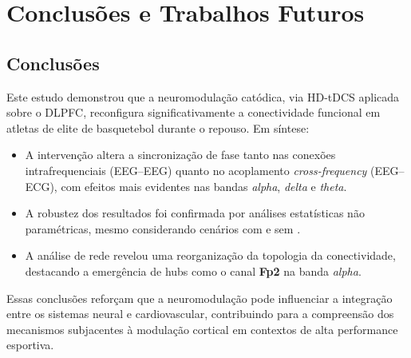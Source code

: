 \chapter{Conclusões e Trabalhos Futuros}
\label{chap:conclusoes_e_trabalhos_futuros}
\section{Conclusões}
Este estudo demonstrou que a neuromodulação catódica, via HD-tDCS aplicada sobre o DLPFC, reconfigura significativamente a conectividade funcional em atletas de elite de basquetebol durante o repouso. Em síntese:
\begin{itemize}
    \item A intervenção altera a sincronização de fase tanto nas conexões intrafrequenciais (EEG--EEG) quanto no acoplamento \textit{cross-frequency} (EEG--ECG), com efeitos mais evidentes nas bandas \emph{alpha}, \emph{delta} e \emph{theta}.
    \item A robustez dos resultados foi confirmada por análises estatísticas não paramétricas, mesmo considerando cenários com e sem .
    \item A análise de rede revelou uma reorganização da topologia da conectividade, destacando a emergência de hubs como o canal \textbf{Fp2} na banda \emph{alpha}.
\end{itemize}
Essas conclusões reforçam que a neuromodulação pode influenciar a integração entre os sistemas neural e cardiovascular, contribuindo para a compreensão dos mecanismos subjacentes à modulação cortical em contextos de alta performance esportiva.

